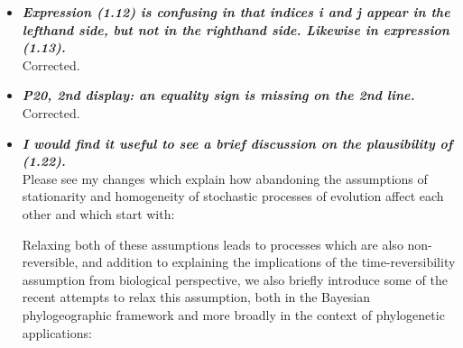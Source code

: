 \documentclass[english]{article}
\begin{document}
\begin{itemize}
\begin{quote}
\myeditsvthree
\end{quote}


\item {
{\it
\textbf{
Expression (1.12) is confusing in that indices i and j appear in the lefthand side, but not in the righthand side. 
Likewise in expression (1.13).
}%
}%
}%
\\
Corrected.



\item {
{\it
\textbf{
P20, 2nd display: an equality sign is missing on the 2nd line.
}%
}%
}%
\\
Corrected.

\item {
{\it
\textbf{
I would find it useful to see a brief discussion on the plausibility of (1.22).
}%
}%
}%
\\
Please see my changes which explain how abandoning the assumptions of stationarity and homogeneity of stochastic processes of evolution affect each other and which start with:

\begin{quote}
\myeditsvsixone
\end{quote}

Relaxing both of these assumptions leads to processes which are also non-reversible, and addition to explaining the implications of the time-reversibility assumption from biological perspective, we also briefly introduce some of the recent attempts to relax this assumption, both in the Bayesian phylogeographic framework and more broadly in the context of phylogenetic applications:


\end{itemize}
\end{document}
